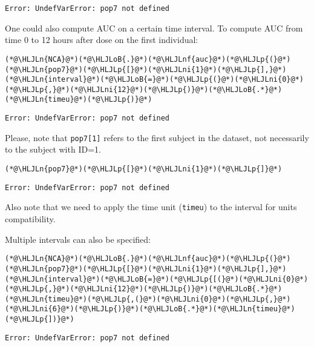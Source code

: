 \documentclass[12pt,a4paper]{article}
\newcommand{\HLJLn}[1]{#1}
\newcommand{\HLJLnf}[1]{\textcolor[RGB]{66,102,213}{#1}}
\newcommand{\HLJLni}[1]{\textcolor[RGB]{59,151,46}{#1}}
\newcommand{\HLJLoB}[1]{\textcolor[RGB]{102,102,102}{\textbf{#1}}}
\newcommand{\HLJLp}[1]{#1}
\begin{document}
\begin{lstlisting}
Error: UndefVarError: pop7 not defined
\end{lstlisting}


One could also compute AUC on a certain time interval. To compute AUC from time 0 to 12 hours after dose on the first individual:


\begin{lstlisting}
(*@\HLJLn{NCA}@*)(*@\HLJLoB{.}@*)(*@\HLJLnf{auc}@*)(*@\HLJLp{(}@*)(*@\HLJLn{pop7}@*)(*@\HLJLp{[}@*)(*@\HLJLni{1}@*)(*@\HLJLp{],}@*) (*@\HLJLn{interval}@*)(*@\HLJLoB{=}@*)(*@\HLJLp{(}@*)(*@\HLJLni{0}@*)(*@\HLJLp{,}@*)(*@\HLJLni{12}@*)(*@\HLJLp{)}@*)(*@\HLJLoB{.*}@*)(*@\HLJLn{timeu}@*)(*@\HLJLp{)}@*)
\end{lstlisting}

\begin{lstlisting}
Error: UndefVarError: pop7 not defined
\end{lstlisting}


Please, note that \texttt{pop7[1]} refers to the first subject in the dataset, not necessarily to the subject with ID=1.


\begin{lstlisting}
(*@\HLJLn{pop7}@*)(*@\HLJLp{[}@*)(*@\HLJLni{1}@*)(*@\HLJLp{]}@*)
\end{lstlisting}

\begin{lstlisting}
Error: UndefVarError: pop7 not defined
\end{lstlisting}


Also note that we need to apply the time unit (\texttt{timeu}) to the interval for units compatibility.

Multiple intervals can also be specified:


\begin{lstlisting}
(*@\HLJLn{NCA}@*)(*@\HLJLoB{.}@*)(*@\HLJLnf{auc}@*)(*@\HLJLp{(}@*)(*@\HLJLn{pop7}@*)(*@\HLJLp{[}@*)(*@\HLJLni{1}@*)(*@\HLJLp{],}@*) (*@\HLJLn{interval}@*)(*@\HLJLoB{=}@*)(*@\HLJLp{[(}@*)(*@\HLJLni{0}@*)(*@\HLJLp{,}@*)(*@\HLJLni{12}@*)(*@\HLJLp{)}@*)(*@\HLJLoB{.*}@*)(*@\HLJLn{timeu}@*)(*@\HLJLp{,(}@*)(*@\HLJLni{0}@*)(*@\HLJLp{,}@*)(*@\HLJLni{6}@*)(*@\HLJLp{)}@*)(*@\HLJLoB{.*}@*)(*@\HLJLn{timeu}@*)(*@\HLJLp{])}@*)
\end{lstlisting}

\begin{lstlisting}
Error: UndefVarError: pop7 not defined
\end{lstlisting}
\end{document}
